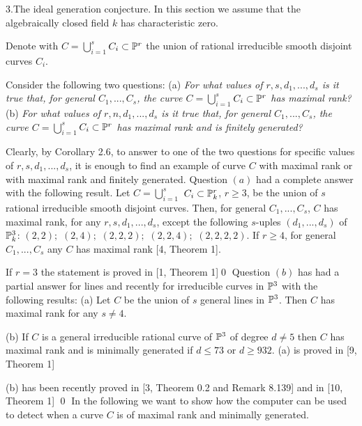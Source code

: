\head 3.The ideal generation conjecture.\endhead
In this section we assume that the algebraically closed field $k$ has
characteristic zero.
 
Denote with $C=$$\bigcup_{i=1}^s$$ C_i  \subset \Bbb P^r$
 the union   of  rational irreducible smooth disjoint curves $C_i$.

Consider the following two questions:\medskip
 (a) {\sl For what values of $r, s, d_1,...,d_s$ is it true that, for
general
$C_1,...,C_s$, the curve $C=$$\bigcup_{i=1}^s$$ C_i  \subset \Bbb P^r$ has
maximal rank?}\medskip
(b) {\sl For what values of $r,n,d_1,...,d_s$ is it true that, for general
$C_1,...,C_s$, the curve $C=$$\bigcup_{i=1}^s$$ C_i  \subset \Bbb P^r$
 has maximal  rank and is finitely generated?}

Clearly, by Corollary 2.6, to answer to one of the two
questions for specific values of 
$r, s, d_1,...,d_s$,
it is enough to
find an example of curve $C$ with maximal rank or with maximal rank
 and finitely generated.
Question $(a)$  had a complete answer with the following result.
 Let $C=$$\bigcup_{i=1}^s$ $ C_i  \subset \Bbb
P_k^r$, $r\geq 3$,
be the union of $s$ rational irreducible smooth disjoint curves. Then, for
general
$C_1,...,C_s$, $C$ has maximal rank, for any $r,s,d_1,...,d_s$, 
 except the following $s$-uples $(d_1,...,d_s)$ of $\Bbb P_k^3$:\medskip
$(2,2);$ $(2,4);$ $(2,2,2);$ $(2,2,4);$ $(2,2,2,2)$.\endproclaim
{} If $r\geq 4$, for general $C_1,...,C_s$ any $C$ has maximal
rank  
[4, Theorem 1]. 

If $r=3$ the statement is proved in [1, Theorem 1]\qed\enddemo
Question $(b)$ has had a partial answer for lines and recently
for irreducible curves in $\Bbb P^3$ with the following results:
 (a) Let $C$
be the union of $s$   general lines in $\Bbb P^3$. Then $C$ has maximal
rank
 for any $s\neq 4$.

(b) If $C$ is a general irreducible rational curve of $\Bbb P^3$ of degree
$d\neq 5$
then
$C$ has maximal rank and is minimally generated if $d\leq 73$ or $d\geq
932$.\endproclaim
{} (a) is proved in [9, Theorem 1]

(b) has been recently proved in [3, Theorem 0.2 and Remark 8.139]  and in
[10, Theorem 1]
\qed\enddemo
In the following we want to show how the computer can be used to detect
 when a curve $C$ is of maximal rank and minimally generated.

